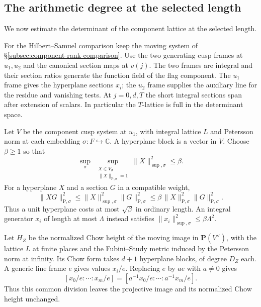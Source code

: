 \subsection{The arithmetic degree at the selected length}
\label{subsec:deep-arithmetic-degree}

We now estimate the determinant of the component lattice at the selected length.

For the Hilbert--Samuel comparison keep the moving system
of \S\ref{subsec:component-rank-comparison}. Use the two
generating cusp frames at \(u_1,u_2\) and the canonical
section maps at \(v(j)\). The two frames are integral and
their section ratios generate the function field of the flag
component. The \(u_1\) frame gives the hyperplane sections \(x_i\);
the \(u_2\) frame supplies the auxiliary line for the residue and
vanishing tests. At \(j=0,d,T\) the short integral sections span after extension of scalars.
In particular the \(T\)-lattice is full in the determinant
space.

Let \(V\) be the component cusp system at \(u_1\), with integral
lattice \(L\) and Petersson norm at each embedding \(\sigma:F\hookrightarrow\mathbb C\).
A hyperplane block is a vector in \(V\). Choose \(\beta\ge1\) so that
\begin{equation}\label{eq:hs-unit-sphere-beta}
 \sup_\sigma\ \sup_{\substack{X\in V_\sigma\\\|X\|_{\mathrm P,\sigma}=1}}
                      \|X\|_{\sup,\sigma}^2\le\beta .
\end{equation}
For a hyperplane \(X\) and a section \(G\) in a compatible weight,
\[
 \|XG\|_{\mathrm P,\sigma}^2
 \le\|X\|_{\sup,\sigma}^2\|G\|_{\mathrm P,\sigma}^2
 \le\beta\,\|X\|_{\mathrm P,\sigma}^2\|G\|_{\mathrm P,\sigma}^2.
\]
Thus a unit hyperplane costs at most \(\sqrt\beta\) in ordinary length.
An integral generator \(x_i\) of length at most \(\Lambda\) instead
satisfies \(\|x_i\|_{\sup,\sigma}^2\le\beta\Lambda^2\).

Let \(H_Z\) be the normalized Chow height of the moving image in
\(\mathbf P(V^\vee)\), with the lattice \(L\) at finite places and
the Fubini--Study metric induced by the Petersson norm at infinity.
Its Chow form takes \(d+1\) hyperplane blocks, of degree \(D_Z\) each.
A generic line frame \(e\) gives values \(x_i/e\).
Replacing \(e\) by \(a e\) with \(a\ne0\) gives
\[
 [x_0/e:\cdots:x_m/e]=
          [a^{-1}x_0/e:\cdots:a^{-1}x_m/e] .
\]
Thus this common division leaves the projective image and
its normalized Chow height unchanged.

